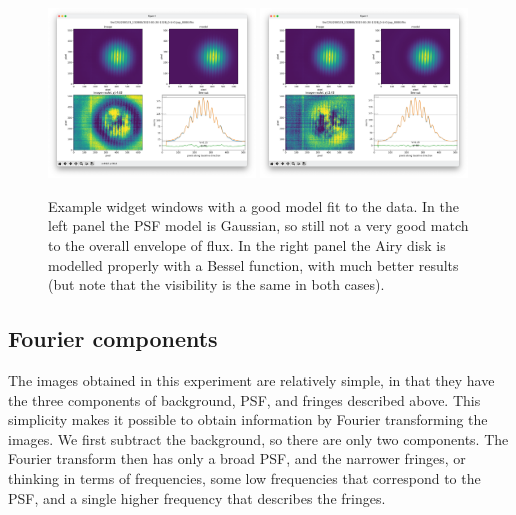 \documentclass[11pt]{article}
\begin{document}
\begin{figure}[h]
    \centering
    \includegraphics[width=0.49\textwidth]{widget2.png}
    \includegraphics[width=0.49\textwidth]{widget3.png}
    \caption{Example widget windows with a good model fit to the data. In the left panel the PSF model is Gaussian, so still not a very good match to the overall envelope of flux. In the right panel the Airy disk is modelled properly with a Bessel function, with much better results (but note that the visibility is the same in both cases).}
    \label{fig:widget2}
\end{figure}

\subsection{Fourier components}\label{sec:fourier}

The images obtained in this experiment are relatively simple, in that they have the three components of background, PSF, and fringes described above. This simplicity makes it possible to obtain information by Fourier transforming the images. We first subtract the background, so there are only two components. The Fourier transform then has only a broad PSF, and the narrower fringes, or thinking in terms of frequencies, some low frequencies that correspond to the PSF, and a single higher frequency that describes the fringes.
\end{document}
